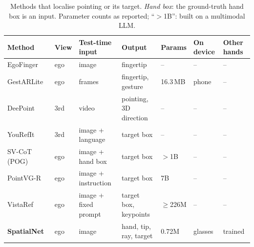 \begin{table}[t]
  \caption{Methods that localise pointing or its target. \emph{Hand box}: the ground-truth hand box is an input. Parameter counts as reported; ``$>$1B'': built on a multimodal LLM.}
  \label{tab:related}
  \footnotesize
  \setlength{\tabcolsep}{3pt}
  \begin{tabular}{lllllll}
    \toprule
    Method & View & Test-time input & Output & Params & On device & Other hands \\
    \midrule
    EgoFinger~\cite{huang2016pointing} & ego & image & fingertip & -- & -- & -- \\
    GestARLite~\cite{jain2019gestarlite} & ego & frames & fingertip, gesture & 16.3\,MB & phone & -- \\
    DeePoint~\cite{nakamura2023deepoint} & 3rd & video & pointing, 3D direction & -- & -- & -- \\
    YouRefIt~\cite{chen2021yourefit} & 3rd & image + language & target box & -- & -- & -- \\
    SV-CoT (POG)~\cite{egopoint} & ego & image + hand box & target box & $>$1B & -- & -- \\
    PointVG-R~\cite{li2026pointvgr} & ego & image + instruction & target box & 7B & -- & -- \\
    VistaRef~\cite{li2026vistaref} & ego & image + fixed prompt & target box, keypoints & $\geq$226M & -- & -- \\
    \textbf{SpatialNet} & ego & image & hand, tip, ray, target & 0.72M & glasses & trained \\
    \bottomrule
  \end{tabular}
\end{table}
